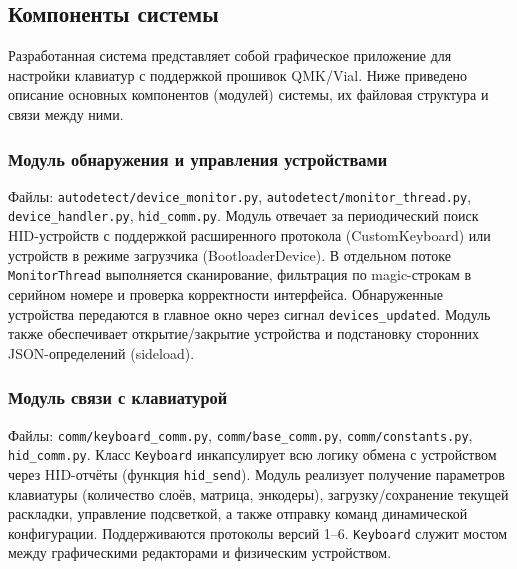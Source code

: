 \subsection{Компоненты системы}

Разработанная система представляет собой графическое приложение для настройки клавиатур с поддержкой прошивок QMK/Vial. Ниже приведено описание основных компонентов (модулей) системы, их файловая структура и связи между ними.

\subsubsection{Модуль обнаружения и управления устройствами}
Файлы: \texttt{autodetect/device\_monitor.py}, \texttt{autodetect/monitor\_thread.py}, \texttt{device\_handler.py}, \texttt{hid\_comm.py}.
Модуль отвечает за периодический поиск HID-устройств с поддержкой расширенного протокола (CustomKeyboard) или устройств в режиме загрузчика (BootloaderDevice). В отдельном потоке \texttt{MonitorThread} выполняется сканирование, фильтрация по magic-строкам в серийном номере и проверка корректности интерфейса. Обнаруженные устройства передаются в главное окно через сигнал \texttt{devices\_updated}. Модуль также обеспечивает открытие/закрытие устройства и подстановку сторонних JSON-определений (sideload).

\subsubsection{Модуль связи с клавиатурой}
Файлы: \texttt{comm/keyboard\_comm.py}, \texttt{comm/base\_comm.py}, \texttt{comm/constants.py}, \texttt{hid\_comm.py}.
Класс \texttt{Keyboard} инкапсулирует всю логику обмена с устройством через HID-отчёты (функция \texttt{hid\_send}). Модуль реализует получение параметров клавиатуры (количество слоёв, матрица, энкодеры), загрузку/сохранение текущей раскладки, управление подсветкой, а также отправку команд динамической конфигурации. Поддерживаются протоколы версий 1–6. \texttt{Keyboard} служит мостом между графическими редакторами и физическим устройством.

